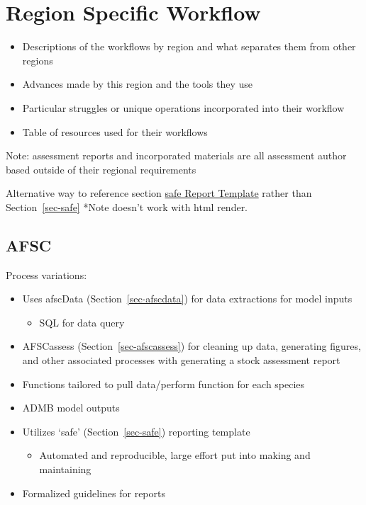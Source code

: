 \documentclass[
  letterpaper,
  oneside,
  open=any]{scrbook}
\providecommand{\tightlist}{%
  \setlength{\itemsep}{0pt}\setlength{\parskip}{0pt}}\usepackage{longtable,booktabs,array}
\begin{document}

\chapter{Region Specific Workflow}\label{sec-regionworkflows}

\begin{itemize}
\item
  Descriptions of the workflows by region and what separates them from
  other regions
\item
  Advances made by this region and the tools they use
\item
  Particular struggles or unique operations incorporated into their
  workflow
\item
  Table of resources used for their workflows
\end{itemize}

Note: assessment reports and incorporated materials are all assessment
author based outside of their regional requirements

Alternative way to reference section \hyperref[sec-safe]{safe Report
Template} rather than Section~\ref{sec-safe} *Note doesn't work with
html render.

\section{AFSC}\label{sec-afsc}

Process variations:

\begin{itemize}
\item
  Uses afscData (Section~\ref{sec-afscdata}) for data extractions for
  model inputs

  \begin{itemize}
  \tightlist
  \item
    SQL for data query
  \end{itemize}
\item
  AFSCassess (Section~\ref{sec-afscassess}) for cleaning up data,
  generating figures, and other associated processes with generating a
  stock assessment report
\item
  Functions tailored to pull data/perform function for each species
\item
  ADMB model outputs
\item
  Utilizes `safe' (Section~\ref{sec-safe}) reporting template

  \begin{itemize}
  \tightlist
  \item
    Automated and reproducible, large effort put into making and
    maintaining
  \end{itemize}
\item
  Formalized guidelines for reports
\end{itemize}
\end{document}
